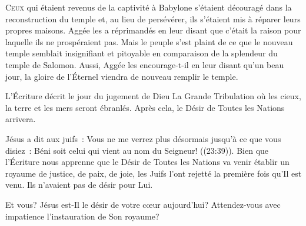 


\lettrine{C}{eux} qui étaient revenus de la captivité à Babylone
 s'étaient découragé dans la reconstruction du temple et,
 au lieu de persévérer, ils s'étaient mis à réparer leurs propres maisons.
 Aggée les a réprimandés en leur disant que c'était la raison
 pour laquelle ils ne prospéraient pas. Mais le peuple s'est plaint
 de ce que le nouveau temple semblait insignifiant et pitoyable
 en comparaison de la splendeur du temple de Salomon.
 Aussi, Aggée les encourage-t-il en leur disant qu'un beau jour,
 la gloire de l'Éternel viendra de nouveau remplir le temple. 


L'Écriture décrit le jour du jugement de Dieu
 \ocadr La Grande Tribulation \fcadr{} où les cieux,
 la terre et les mers seront ébranlés. Après cela,
 le \Og Désir de Toutes les Nations \Fg{} arrivera. 

Jésus a dit aux juifs~: 
 \Og Vous ne me verrez plus désormais jusqu'à ce que vous disiez~:
 Béni soit celui qui vient au nom du Seigneur! \Fg{} ((23:39)).
 Bien que l'Écriture nous apprenne que \Og le Désir de Toutes les Nations \Fg{}
 va venir établir un royaume de justice, de paix, de joie, les Juifs
 l'ont rejetté la première fois qu'Il est venu.
 Ils n'avaient pas de désir pour Lui. 

Et vous? Jésus est-Il le désir de votre c\oe{}ur aujourd'hui?
 Attendez-vous avec impatience l'instauration de Son royaume? 

\dvrule




